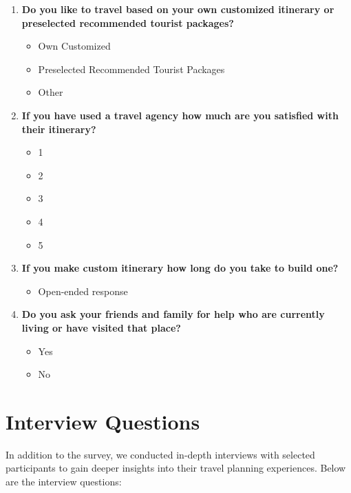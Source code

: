 \documentclass[conference]{IEEEtran}
\begin{document}
\begin{enumerate}
        \item \textbf{Do you like to travel based on your own customized itinerary or preselected recommended tourist packages?}
        \begin{itemize}
            \item Own Customized
            \item Preselected Recommended Tourist Packages
            \item Other
        \end{itemize}

        \item \textbf{If you have used a travel agency how much are you satisfied with their itinerary?}
        \begin{itemize}
            \item 1
            \item 2
            \item 3
            \item 4
            \item 5
        \end{itemize}

        \item \textbf{If you make custom itinerary how long do you take to build one?}
        \begin{itemize}
            \item Open-ended response
        \end{itemize}

        \item \textbf{Do you ask your friends and family for help who are currently living or have visited that place?}
        \begin{itemize}
            \item Yes
            \item No
        \end{itemize}
    \end{enumerate}

\section{Interview Questions}
    In addition to the survey, we conducted in-depth interviews with selected participants to gain deeper insights into their travel planning experiences. Below are the interview questions:
\end{document}
